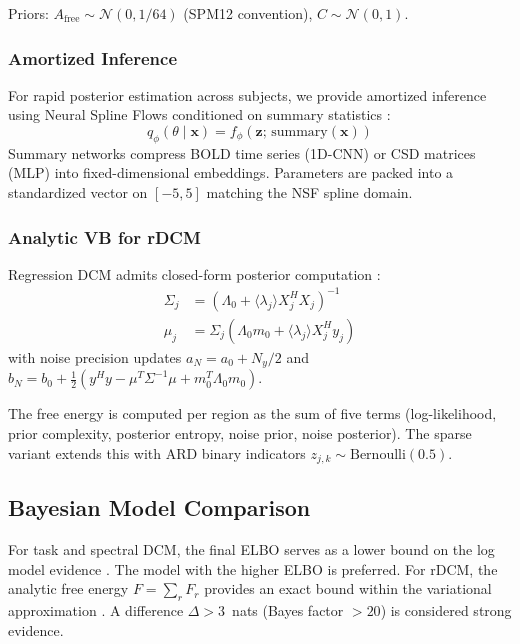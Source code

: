 Priors: $A_\text{free} \sim \mathcal{N}(0, 1/64)$ (SPM12 convention),
$C \sim \mathcal{N}(0, 1)$.

\subsubsection{Amortized Inference}

For rapid posterior estimation across subjects, we provide amortized
inference using Neural Spline Flows \citep{papamakarios2021} conditioned
on summary statistics \citep{cranmer2020}:
\begin{equation}
  q_\phi(\theta \mid \mathbf{x})
    = f_\phi\!\left(\mathbf{z};\, \text{summary}(\mathbf{x})\right)
  \label{eq:amortized}
\end{equation}
Summary networks compress BOLD time series (1D-CNN) or CSD matrices
(MLP) into fixed-dimensional embeddings. Parameters are packed into a
standardized vector on $[-5, 5]$ matching the NSF spline domain.

\subsubsection{Analytic VB for rDCM}

Regression DCM admits closed-form posterior computation
\citep{frassle2017}:
\begin{align}
  \Sigma_j &= \left(\Lambda_0 + \langle\lambda_j\rangle X_j^H X_j\right)^{-1}
    \label{eq:rdcm-cov} \\
  \mu_j &= \Sigma_j
    \left(\Lambda_0 m_0 + \langle\lambda_j\rangle X_j^H y_j\right)
    \label{eq:rdcm-mean}
\end{align}
with noise precision updates $a_N = a_0 + N_y/2$ and
$b_N = b_0 + \frac{1}{2}(y^H y - \mu^T \Sigma^{-1} \mu + m_0^T \Lambda_0 m_0)$.

The free energy is computed per region as the sum of five terms
(log-likelihood, prior complexity, posterior entropy, noise prior, noise
posterior). The sparse variant \citep{frassle2018} extends this with ARD
binary indicators $z_{j,k} \sim \text{Bernoulli}(0.5)$.

\subsection{Bayesian Model Comparison}

For task and spectral DCM, the final ELBO serves as a lower bound on the
log model evidence \citep{friston2007vfe}. The model with the higher
ELBO is preferred. For rDCM, the analytic free energy $F = \sum_r F_r$
provides an exact bound within the variational approximation
\citep{frassle2017}. A difference $\Delta > 3$~nats (Bayes factor $> 20$)
is considered strong evidence.

